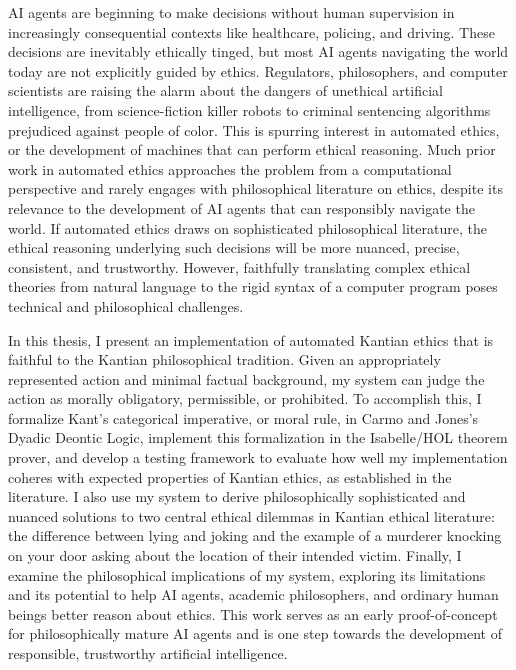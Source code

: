 %
\begin{isabellebody}%
%
%
\isadelimtheory
%
\endisadelimtheory
%
\isatagtheory
%
\endisatagtheory
{\isafoldtheory}%
%
\isadelimtheory
%
\endisadelimtheory
%
\begin{isamarkuptext}%
AI agents are beginning to make decisions without human supervision in increasingly consequential 
contexts like healthcare, policing, and driving. These decisions are inevitably ethically tinged, 
but most AI agents navigating the world today are not explicitly guided by ethics.
Regulators, philosophers, and computer scientists are raising the alarm about the 
dangers of unethical artificial intelligence, from science-fiction killer robots to criminal
sentencing algorithms prejudiced against people of color. This is spurring interest in automated ethics, or the development 
of machines that can perform ethical reasoning. Much prior work in automated ethics approaches the 
problem from a computational perspective and rarely engages with philosophical literature on ethics, despite
its relevance to the development of AI agents that can
responsibly navigate the world. If automated ethics draws on sophisticated philosophical literature, the ethical reasoning
underlying such decisions will be more nuanced, precise, consistent, and trustworthy. However, faithfully translating complex ethical theories
from natural language to the rigid syntax of a computer program poses technical and philosophical 
challenges. 

In this thesis, I present an implementation of automated Kantian
ethics that is faithful to the Kantian philosophical tradition. Given an appropriately represented 
action and minimal factual background, my system can judge the action as morally obligatory, permissible, or prohibited.
To accomplish this, I formalize Kant's categorical imperative, or moral rule,
in Carmo and Jones's Dyadic Deontic Logic, implement this formalization 
in the Isabelle/HOL theorem prover, and develop a testing framework to evaluate how well 
my implementation coheres with expected properties of Kantian ethics, as established in the literature. 
I also use my system to derive philosophically sophisticated and nuanced solutions to two central ethical 
dilemmas in Kantian ethical literature: the difference
between lying and joking and the example of a murderer knocking on your door asking about the location of their
intended victim. Finally, I examine the philosophical implications of my system, exploring its limitations 
and its potential to help AI agents, academic philosophers, and ordinary human beings better reason about ethics. This work serves 
as an early proof-of-concept for philosophically mature AI agents and is one step towards the development 
of responsible, trustworthy artificial intelligence.%
\end{isamarkuptext}\isamarkuptrue%
%
\isadelimtheory
%
\endisadelimtheory
%
\isatagtheory
%
\endisatagtheory
{\isafoldtheory}%
%
\isadelimtheory
%
\endisadelimtheory
%
\end{isabellebody}%
